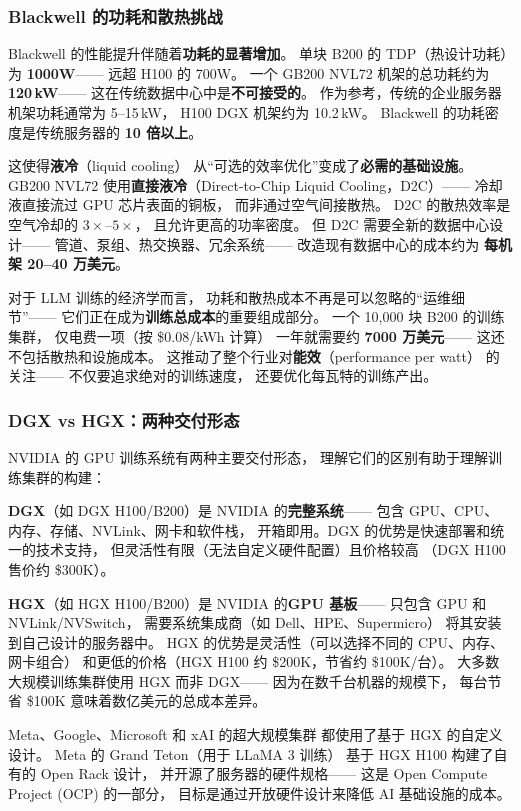\subsubsection{Blackwell 的功耗和散热挑战}

Blackwell 的性能提升伴随着\textbf{功耗的显著增加}。
单块 B200 的 TDP（热设计功耗）为 \textbf{1000W}——
远超 H100 的 700W。
一个 GB200 NVL72 机架的总功耗约为 \textbf{120\,kW}——
这在传统数据中心中是\textbf{不可接受的}。
作为参考，传统的企业服务器机架功耗通常为 5--15\,kW，
H100 DGX 机架约为 10.2\,kW。
Blackwell 的功耗密度是传统服务器的 \textbf{10 倍以上}。

这使得\textbf{液冷}（liquid cooling）
从``可选的效率优化''变成了\textbf{必需的基础设施}。
GB200 NVL72 使用\textbf{直接液冷}（Direct-to-Chip Liquid Cooling，D2C）——
冷却液直接流过 GPU 芯片表面的铜板，
而非通过空气间接散热。
D2C 的散热效率是空气冷却的 $3\times$--$5\times$，
且允许更高的功率密度。
但 D2C 需要全新的数据中心设计——
管道、泵组、热交换器、冗余系统——
改造现有数据中心的成本约为
\textbf{每机架 20--40 万美元}。

对于 LLM 训练的经济学而言，
功耗和散热成本不再是可以忽略的``运维细节''——
它们正在成为\textbf{训练总成本}的重要组成部分。
一个 10,000 块 B200 的训练集群，
仅电费一项（按 \$0.08/kWh 计算）
一年就需要约 \textbf{7000 万美元}——
这还不包括散热和设施成本。
这推动了整个行业对\textbf{能效}（performance per watt）
的关注——
不仅要追求绝对的训练速度，
还要优化每瓦特的训练产出。

\subsubsection{DGX vs HGX：两种交付形态}

NVIDIA 的 GPU 训练系统有两种主要交付形态，
理解它们的区别有助于理解训练集群的构建：

\textbf{DGX}（如 DGX H100/B200）是 NVIDIA 的\textbf{完整系统}——
包含 GPU、CPU、内存、存储、NVLink、网卡和软件栈，
开箱即用。DGX 的优势是快速部署和统一的技术支持，
但灵活性有限（无法自定义硬件配置）且价格较高
（DGX H100 售价约 \$300K）。

\textbf{HGX}（如 HGX H100/B200）是 NVIDIA 的\textbf{GPU 基板}——
只包含 GPU 和 NVLink/NVSwitch，
需要系统集成商（如 Dell、HPE、Supermicro）
将其安装到自己设计的服务器中。
HGX 的优势是灵活性（可以选择不同的 CPU、内存、网卡组合）
和更低的价格（HGX H100 约 \$200K，节省约 \$100K/台）。
大多数大规模训练集群使用 HGX 而非 DGX——
因为在数千台机器的规模下，
每台节省 \$100K 意味着数亿美元的总成本差异。

Meta、Google、Microsoft 和 xAI 的超大规模集群
都使用了基于 HGX 的自定义设计。
Meta 的 Grand Teton（用于 LLaMA 3 训练）
基于 HGX H100 构建了自有的 Open Rack 设计，
并开源了服务器的硬件规格——
这是 Open Compute Project (OCP) 的一部分，
目标是通过开放硬件设计来降低 AI 基础设施的成本。

